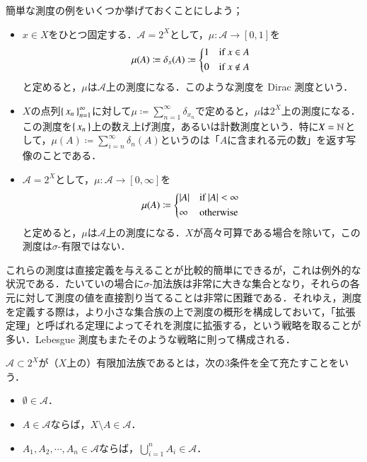 \begin{exm}簡単な測度の例をいくつか挙げておくことにしよう；
\begin{itemize}
\item $x\in X$をひとつ固定する．$\mathcal{A}=2^X$として，$\mu \colon \mathcal{A} \to [0,1]$を
\begin{equation}
\mu(A) \coloneqq \delta_x(A) \coloneqq \begin{dcases*}
    1 & if $x \in A$ \\
    0 & if $x \notin A$
  \end{dcases*}
\end{equation}と定めると，$\mu$は$\mathcal{A}$上の測度になる．このような測度を Dirac 測度という．
\item $X$の点列$\set{x_n}_{n=1}^\infty$に対して$\mu \coloneqq \sum_{n=1}^\infty \delta_{x_n}$で定めると，$\mu$は$2^X$上の測度になる．この測度を$\set{x_n}$上の数え上げ測度，あるいは計数測度という．特に$X = \mathbb{N}$として，$\mu(A) \coloneqq \sum_{i=n}^\infty \delta_n (A)$というのは「$A$に含まれる元の数」を返す写像のことである．
\item $\mathcal{A}=2^X$として，$\mu \colon \mathcal{A} \to [0,\infty]$を
\begin{equation}
\mu(A) \coloneqq \begin{dcases*}
    |A| & if $|A| < \infty$ \\
    \infty & otherwise
  \end{dcases*}
\end{equation}と定めると，$\mu$は$\mathcal{A}$上の測度になる．$X$が高々可算である場合を除いて，この測度は$\sigma$-有限ではない．
\end{itemize}
\end{exm}

これらの測度は直接定義を与えることが比較的簡単にできるが，これは例外的な状況である．たいていの場合に$\sigma$-加法族は非常に大きな集合となり，それらの各元に対して測度の値を直接割り当てることは非常に困難である．それゆえ，測度を定義する際は，より小さな集合族の上で測度の概形を構成しておいて，「拡張定理」と呼ばれる定理によってそれを測度に拡張する，という戦略を取ることが多い．Lebesgue 測度もまたそのような戦略に則って構成される．

\begin{defi}
$\mathcal{A} \subset 2^X$が（$X$上の）有限加法族であるとは，次の3条件を全て充たすことをいう．

\begin{itemize}
\item $\emptyset \in \mathcal{A}$．
\item $A \in \mathcal{A}$ならば，$X \setminus A \in \mathcal{A}$．
\item $A_1, A_2, \cdots, A_n \in \mathcal{A}$ならば，$\bigcup_{i=1}^n A_i \in \mathcal{A}$．
\end{itemize}
\end{defi}

